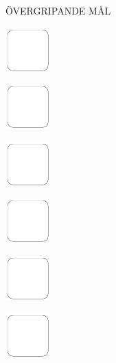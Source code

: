 \documentclass[11pt,titlepage]{article}
\begin{document}
\pagebreak

\small
\hfill ÖVERGRIPANDE MÅL

\vspace{6mm}

\noindent
\includegraphics[]{checkbox-10mm.pdf}

\vspace{14,7mm}

\noindent
\includegraphics[]{checkbox-10mm.pdf}

\vspace{14,7mm}

\noindent
\includegraphics[]{checkbox-10mm.pdf}

\vspace{14,7mm}

\noindent
\includegraphics[]{checkbox-10mm.pdf}

\vspace{14,7mm}

\noindent
\includegraphics[]{checkbox-10mm.pdf}

\vspace{14,7mm}

\noindent
\includegraphics[]{checkbox-10mm.pdf}

\pagebreak
\end{document}
